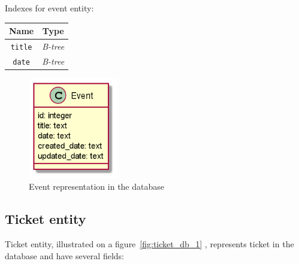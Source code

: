 Indexes for event entity:

\begin{center}
    \begin{tabular}{ | c | c | }
        \hline
        \textbf{Name}  & \textbf{Type}   \\ \hline
        \texttt{title}  & \textit{B-tree} \\ \hline
        \texttt{date} & \textit{B-tree} \\ \hline
    \end{tabular}
\end{center}

\begin{figure}[h]
    \centering
    \includegraphics[width=0.35\textwidth]{images/event}
    \caption{Event representation in the database}
    \label{fig:event_db_1}
\end{figure}

\subsection{Ticket entity}\label{subsec:ticket-entity}

Ticket entity, illustrated on a figure~\ref{fig:ticket_db_1} , represents ticket in the database and have several fields:

